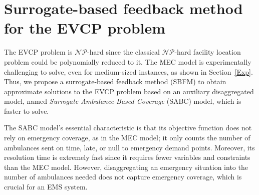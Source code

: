 \section{Surrogate-based feedback method for the EVCP problem} \label{IF}


The EVCP problem is $\mathcal{NP}$-hard since the classical $\mathcal{NP}$-hard facility location problem \citep{megiddo1982complexity} could be polynomially reduced to it. The MEC model is experimentally cha\-llen\-ging to solve, even for medium-sized instances, as shown in Section~\ref{Exp}. Thus, we propose a surrogate-based feedback method (SBFM) to obtain approximate solutions to the EVCP problem based on an auxiliary disaggregated model, named \textit{Surrogate Ambulance-Based Coverage} (SABC) model, which is faster to solve. 

The SABC model's essential characteristic is that its objective function does not rely on emergency coverage, as in the MEC model; it only counts the number of ambulances sent on time, late, or null to emergency demand points. Moreover, its resolution time is extremely fast since it requires fewer variables and constraints than the MEC model. However, disaggregating an emergency situation into the number of ambulances needed does not capture emergency coverage, which is crucial for an EMS system.

